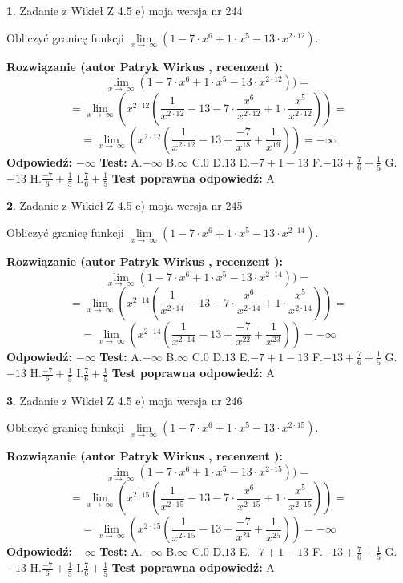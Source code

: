 \documentclass[12pt, a4paper]{article}
\theoremstyle{definition} %
\newtheorem{zad}{}
\newcommand{\zadStart}[1]{\begin{zad}#1\newline}
\newcommand{\zadStop}{\end{zad}}
\newcommand{\rozwStart}[2]{\noindent \textbf{Rozwiązanie (autor #1 , recenzent #2): }\newline}
\newcommand{\rozwStop}{\newline}
\newcommand{\odpStart}{\noindent \textbf{Odpowiedź:}\newline}
\newcommand{\odpStop}{\newline}
\newcommand{\testStart}{\noindent \textbf{Test:}\newline}
\newcommand{\testStop}{\newline}
\newcommand{\kluczStart}{\noindent \textbf{Test poprawna odpowiedź:}\newline}
\newcommand{\kluczStop}{\newline}
\begin{document}
\zadStart{Zadanie z Wikieł Z 4.5 e) moja wersja nr 244}



Obliczyć granicę funkcji  $\lim\limits_{x\to\ \infty}(1 - 7 \cdot x^{6}+1 \cdot x^{5}- 13 \cdot x^{2\cdot12})$.
\zadStop
\rozwStart{Patryk Wirkus}{}
$$\lim\limits_{x\to\ \infty}(1 - 7 \cdot x^{6}+1 \cdot x^{5}- 13 \cdot x^{2\cdot12}))=$$
$$=\lim\limits_{x\to\ \infty}(x^{2\cdot12}(\frac{1}{x^{2\cdot12}}-13 -7 \cdot \frac{x^{6}}{x^{2\cdot12}}+1 \cdot \frac{x^{5}}{x^{2\cdot12}}))=$$
$$=\lim\limits_{x\to\ \infty}(x^{2\cdot12}(\frac{1}{x^{2\cdot12}}-13 + \frac{-7}{x^{18}}+ \frac{1}{x^{19}}))=-\infty$$
\rozwStop
\odpStart
$-\infty$
\odpStop
\testStart
A.$-\infty$ B.$\infty$ C.$0$ D.$13$ E.$-7 + 1 - 13$
F.$-13+\frac{7}{6}+\frac{1}{5}$ G.$-13$
H.$\frac{-7}{6}+\frac{1}{5}$
I.$\frac{7}{6}+\frac{1}{5}$
\testStop
\kluczStart
A
\kluczStop



\zadStart{Zadanie z Wikieł Z 4.5 e) moja wersja nr 245}



Obliczyć granicę funkcji  $\lim\limits_{x\to\ \infty}(1 - 7 \cdot x^{6}+1 \cdot x^{5}- 13 \cdot x^{2\cdot14})$.
\zadStop
\rozwStart{Patryk Wirkus}{}
$$\lim\limits_{x\to\ \infty}(1 - 7 \cdot x^{6}+1 \cdot x^{5}- 13 \cdot x^{2\cdot14}))=$$
$$=\lim\limits_{x\to\ \infty}(x^{2\cdot14}(\frac{1}{x^{2\cdot14}}-13 -7 \cdot \frac{x^{6}}{x^{2\cdot14}}+1 \cdot \frac{x^{5}}{x^{2\cdot14}}))=$$
$$=\lim\limits_{x\to\ \infty}(x^{2\cdot14}(\frac{1}{x^{2\cdot14}}-13 + \frac{-7}{x^{22}}+ \frac{1}{x^{23}}))=-\infty$$
\rozwStop
\odpStart
$-\infty$
\odpStop
\testStart
A.$-\infty$ B.$\infty$ C.$0$ D.$13$ E.$-7 + 1 - 13$
F.$-13+\frac{7}{6}+\frac{1}{5}$ G.$-13$
H.$\frac{-7}{6}+\frac{1}{5}$
I.$\frac{7}{6}+\frac{1}{5}$
\testStop
\kluczStart
A
\kluczStop



\zadStart{Zadanie z Wikieł Z 4.5 e) moja wersja nr 246}



Obliczyć granicę funkcji  $\lim\limits_{x\to\ \infty}(1 - 7 \cdot x^{6}+1 \cdot x^{5}- 13 \cdot x^{2\cdot15})$.
\zadStop
\rozwStart{Patryk Wirkus}{}
$$\lim\limits_{x\to\ \infty}(1 - 7 \cdot x^{6}+1 \cdot x^{5}- 13 \cdot x^{2\cdot15}))=$$
$$=\lim\limits_{x\to\ \infty}(x^{2\cdot15}(\frac{1}{x^{2\cdot15}}-13 -7 \cdot \frac{x^{6}}{x^{2\cdot15}}+1 \cdot \frac{x^{5}}{x^{2\cdot15}}))=$$
$$=\lim\limits_{x\to\ \infty}(x^{2\cdot15}(\frac{1}{x^{2\cdot15}}-13 + \frac{-7}{x^{24}}+ \frac{1}{x^{25}}))=-\infty$$
\rozwStop
\odpStart
$-\infty$
\odpStop
\testStart
A.$-\infty$ B.$\infty$ C.$0$ D.$13$ E.$-7 + 1 - 13$
F.$-13+\frac{7}{6}+\frac{1}{5}$ G.$-13$
H.$\frac{-7}{6}+\frac{1}{5}$
I.$\frac{7}{6}+\frac{1}{5}$
\testStop
\kluczStart
A
\kluczStop
\end{document}
